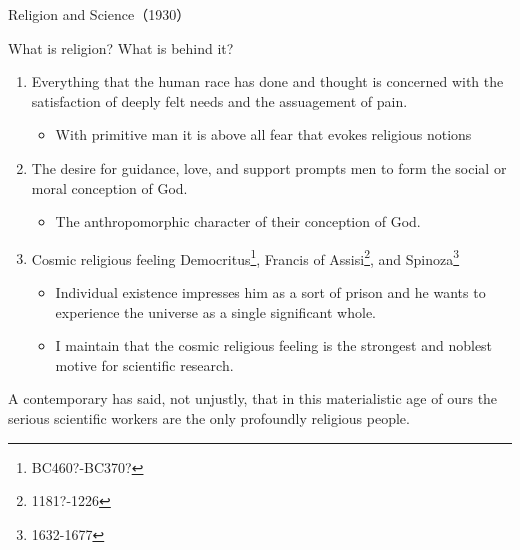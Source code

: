 \documentclass[10pt, dvipdfmx]{beamer}
\begin{document}
\begin{frame}{Religion and Science（1930）}

\begin{block}{What is religion? What is behind it?}
\begin{enumerate}
\item Everything that the human race has done and thought is concerned with the satisfaction of deeply felt needs and the assuagement of pain.
\begin{itemize}
\item With primitive man it is above all fear that evokes religious notions%
\end{itemize}
\item The desire for guidance, love, and support prompts men to form the social or moral conception of God. 
\begin{itemize}
\item %
The anthropomorphic character of their conception of God.
\end{itemize}
\item Cosmic religious feeling \hfill Democritus\footnote{BC460?-BC370?}, Francis of Assisi\footnote{1181?-1226}, and Spinoza\footnote{1632-1677}
\begin{itemize}
\item Individual existence impresses him as a sort of prison and he wants to experience the universe as a single significant whole.
\item I maintain that the cosmic religious feeling is the strongest and noblest motive for scientific research.
\end{itemize}
\end{enumerate}
A contemporary has said, not unjustly, that in this materialistic age of ours the serious scientific workers are the only profoundly religious people.
\end{block}

\end{frame}
\end{document}
